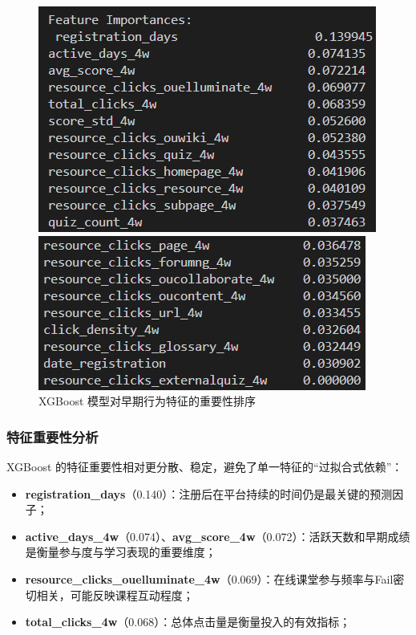 \documentclass{SYSUReport}
\begin{document}
\begin{figure}[htbp]
    \centering
    \begin{minipage}[b]{0.48\textwidth}
        \centering
        \includegraphics[width=\linewidth]{figures/xgb_features1.png}
    \end{minipage}
    \hfill
    \begin{minipage}[b]{0.48\textwidth}
        \centering
        \includegraphics[width=\linewidth]{figures/xgb_features2.png}
    \end{minipage}
    \caption{XGBoost 模型对早期行为特征的重要性排序}
    \label{fig:xgb_feature_importance}
\end{figure}

\subsubsection{特征重要性分析}

XGBoost 的特征重要性相对更分散、稳定，避免了单一特征的“过拟合式依赖”：

\begin{itemize}
    \item \textbf{registration\_days}（0.140）：注册后在平台持续的时间仍是最关键的预测因子；
    \item \textbf{active\_days\_4w}（0.074）、\textbf{avg\_score\_4w}（0.072）：活跃天数和早期成绩是衡量参与度与学习表现的重要维度；
    \item \textbf{resource\_clicks\_ouelluminate\_4w}（0.069）：在线课堂参与频率与Fail密切相关，可能反映课程互动程度；
    \item \textbf{total\_clicks\_4w}（0.068）：总体点击量是衡量投入的有效指标；
\end{itemize}
\end{document}
